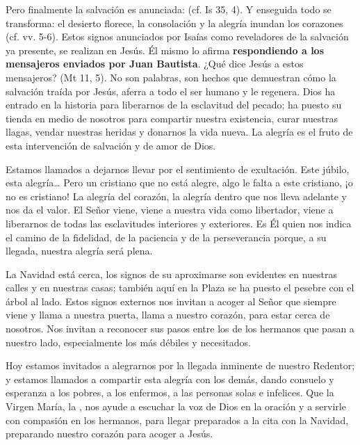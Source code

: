 Pero finalmente la salvación es anunciada:  (cf. Is 35, 4). Y enseguida todo se transforma: el desierto florece, la consolación y la alegría inundan los corazones (cf. vv. 5-6). Estos signos anunciados por Isaías como reveladores de la salvación ya presente, se realizan en Jesús. Él mismo lo afirma \textbf{respondiendo a los mensajeros enviados por Juan Bautista}. ¿Qué dice Jesús a estos mensajeros?  (Mt 11, 5). No son palabras, son hechos que demuestran cómo la salvación traída por Jesús, aferra a todo el ser humano y le regenera. Dios ha entrado en la historia para liberarnos de la esclavitud del pecado; ha puesto su tienda en medio de nosotros para compartir nuestra existencia, curar nuestras llagas, vendar nuestras heridas y donarnos la vida nueva. La alegría es el fruto de esta intervención de salvación y de amor de Dios.

Estamos llamados a dejarnos llevar por el sentimiento de exultación. Este júbilo, esta alegría\ldots{} Pero un cristiano que no está alegre, algo le falta a este cristiano, ¡o no es cristiano! La alegría del corazón, la alegría dentro que nos lleva adelante y nos da el valor. El Señor viene, viene a nuestra vida como libertador, viene a liberarnos de todas las esclavitudes interiores y exteriores. Es Él quien nos indica el camino de la fidelidad, de la paciencia y de la perseverancia porque, a su llegada, nuestra alegría será plena.

La Navidad está cerca, los signos de su aproximarse son evidentes en nuestras calles y en nuestras casas; también aquí en la Plaza se ha puesto el pesebre con el árbol al lado. Estos signos externos nos invitan a acoger al Señor que siempre viene y llama a nuestra puerta, llama a nuestro corazón, para estar cerca de nosotros. Nos invitan a reconocer sus pasos entre los de los hermanos que pasan a nuestro lado, especialmente los más débiles y necesitados.

Hoy estamos invitados a alegrarnos por la llegada inminente de nuestro Redentor; y estamos llamados a compartir esta alegría con los demás, dando consuelo y esperanza a los pobres, a los enfermos, a las personas solas e infelices. Que la Virgen María, la , nos ayude a escuchar la voz de Dios en la oración y a servirle con compasión en los hermanos, para llegar preparados a la cita con la Navidad, preparando nuestro corazón para acoger a Jesús.


